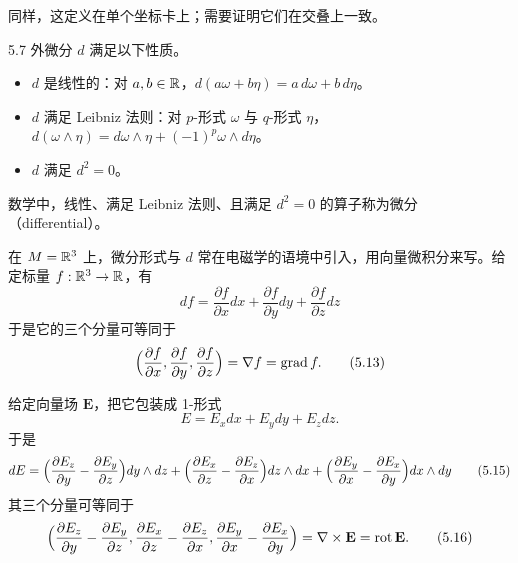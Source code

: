 同样，这定义在单个坐标卡上；需要证明它们在交叠上一致。

\begin{proposition}{5.7}
  外微分 $d$ 满足以下性质。
  \begin{itemize}
    \item $d$ 是线性的：对 $a,b\in\mathbb{R}$，$d(a\omega+b\eta)=a\,d\omega+b\,d\eta$。
    \item $d$ 满足 Leibniz 法则：对 $p$-形式 $\omega$ 与 $q$-形式 $\eta$，$d(\omega\wedge\eta)=d\omega\wedge\eta+(-1)^p\omega\wedge d\eta$。
    \item $d$ 满足 $d^2=0$。
  \end{itemize}
\end{proposition}

数学中，线性、满足 Leibniz 法则、且满足 $d^2=0$ 的算子称为微分（differential）。

在 $M=\mathbb{R}^3$ 上，微分形式与 $d$ 常在电磁学的语境中引入，用向量微积分来写。给定标量 $f:\mathbb{R}^3\to\mathbb{R}$，有
\begin{equation}
  df=\frac{\partial f}{\partial x}dx+\frac{\partial f}{\partial y}dy+\frac{\partial f}{\partial z}dz
  \tag{5.12}
\end{equation}
于是它的三个分量可等同于
\begin{equation}
  \Bigl(\frac{\partial f}{\partial x},\frac{\partial f}{\partial y},\frac{\partial f}{\partial z}\Bigr)=\nabla f=\operatorname{grad}f.
  \tag{5.13}
\end{equation}

给定向量场 $\mathbf{E}$，把它包装成 1-形式
\begin{equation}
  E=E_xdx+E_ydy+E_zdz.
  \tag{5.14}
\end{equation}
于是
\begin{equation}
  dE=\Bigl(\frac{\partial E_z}{\partial y}-\frac{\partial E_y}{\partial z}\Bigr)dy\wedge dz
  +\Bigl(\frac{\partial E_x}{\partial z}-\frac{\partial E_z}{\partial x}\Bigr)dz\wedge dx
  +\Bigl(\frac{\partial E_y}{\partial x}-\frac{\partial E_x}{\partial y}\Bigr)dx\wedge dy
  \tag{5.15}
\end{equation}
其三个分量可等同于
\begin{equation}
  \Bigl(\frac{\partial E_z}{\partial y}-\frac{\partial E_y}{\partial z},
  \frac{\partial E_x}{\partial z}-\frac{\partial E_z}{\partial x},
  \frac{\partial E_y}{\partial x}-\frac{\partial E_x}{\partial y}\Bigr)
  =\nabla\times\mathbf{E}=\operatorname{rot}\mathbf{E}.
  \tag{5.16}
\end{equation}

